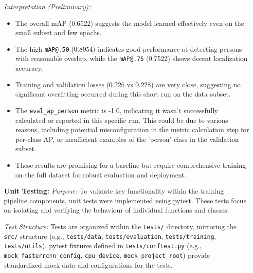 \textit{Interpretation (Preliminary):}
\begin{itemize}
    \item The overall mAP (0.6522) suggests the model learned effectively even on the small subset and few epochs.
    \item The high \texttt{mAP@.50} (0.8954) indicates good performance at detecting persons with reasonable overlap, while the \texttt{mAP@.75} (0.7522) shows decent localization accuracy.
    \item Training and validation losses (0.226 vs 0.228) are very close, suggesting no significant overfitting occurred during this short run on the data subset.
    \item The \texttt{eval\_ap\_person} metric is -1.0, indicating it wasn't successfully calculated or reported in this specific run. This could be due to various reasons, including potential misconfiguration in the metric calculation step for per-class AP, or insufficient examples of the 'person' class in the validation subset.
    \item These results are promising for a baseline but require comprehensive training on the full dataset for robust evaluation and deployment.
\end{itemize}

\textbf{Unit Testing:}
\textit{Purpose:} To validate key functionality within the training pipeline components, unit tests were implemented using pytest. These tests focus on isolating and verifying the behaviour of individual functions and classes.

\textit{Test Structure:} Tests are organized within the \texttt{tests/} directory, mirroring the \texttt{src/} structure (e.g., \texttt{tests/data}, \texttt{tests/evaluation}, \texttt{tests/training}, \texttt{tests/utils}). pytest fixtures defined in \texttt{tests/conftest.py} (e.g., \texttt{mock\_fasterrcnn\_config}, \texttt{cpu\_device}, \texttt{mock\_project\_root}) provide standardized mock data and configurations for the tests.

